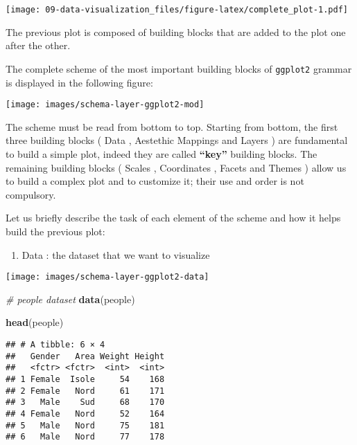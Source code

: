 \documentclass[]{book}
\newenvironment{Shaded}{\begin{snugshade}}{\end{snugshade}}
\newcommand{\KeywordTok}[1]{\textcolor[rgb]{0.13,0.29,0.53}{\textbf{{#1}}}}
\newcommand{\CommentTok}[1]{\textcolor[rgb]{0.56,0.35,0.01}{\textit{{#1}}}}
\newcommand{\NormalTok}[1]{{#1}}
\providecommand{\tightlist}{%
  \setlength{\itemsep}{0pt}\setlength{\parskip}{0pt}}
\def\tightlist{}
\begin{document}
\texttt{[image: 09-data-visualization\_files/figure-latex/complete\_plot-1.pdf]}

The previous plot is composed of building blocks that are added to the
plot one after the other.

The complete scheme of the most important building blocks of
\texttt{ggplot2} grammar is displayed in the following figure:

\texttt{[image: images/schema-layer-ggplot2-mod]}

The scheme must be read from bottom to top. Starting from bottom, the
first three building blocks ( {Data} , {Aestethic Mappings} and {Layers}
) are fundamental to build a simple plot, indeed they are called
\textbf{``key''} building blocks. The remaining building blocks (
{Scales} , {Coordinates} , {Facets} and {Themes} ) allow us to build a
complex plot and to customize it; their use and order is not compulsory.

Let us briefly describe the task of each element of the scheme and how
it helps build the previous plot:

\begin{enumerate}
\def\labelenumi{\arabic{enumi}.}
\tightlist
\item
   {Data} : the dataset that we want to visualize
\end{enumerate}

\texttt{[image: images/schema-layer-ggplot2-data]}

\begin{Shaded}
\begin{Highlighting}[]
\CommentTok{# people dataset}
\KeywordTok{data}\NormalTok{(people)}
\end{Highlighting}
\end{Shaded}

\begin{Shaded}
\begin{Highlighting}[]
\KeywordTok{head}\NormalTok{(people)}
\end{Highlighting}
\end{Shaded}

\begin{verbatim}
## # A tibble: 6 × 4
##   Gender   Area Weight Height
##   <fctr> <fctr>  <int>  <int>
## 1 Female  Isole     54    168
## 2 Female   Nord     61    171
## 3   Male    Sud     68    170
## 4 Female   Nord     52    164
## 5   Male   Nord     75    181
## 6   Male   Nord     77    178
\end{verbatim}
\end{document}
